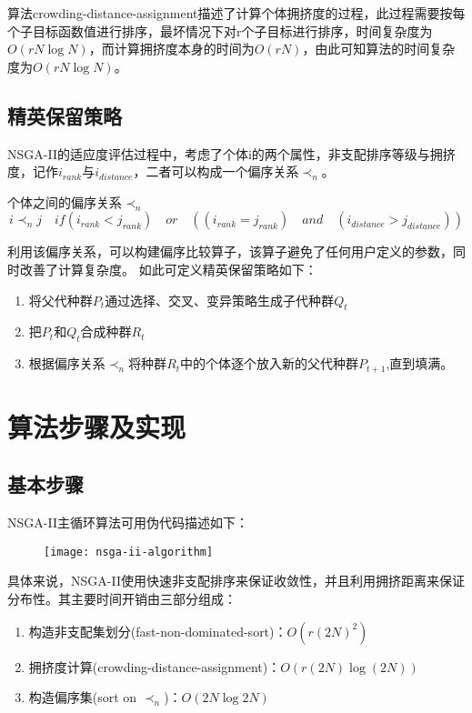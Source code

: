 \documentclass[lang=cn,a4paper,citestyle=gb7714-2015, bibstyle=gb7714-2015]{elegantpaper}
\begin{document}
    算法crowding-distance-assignment描述了计算个体拥挤度的过程，此过程需要按每个子目标函数值进行排序，最坏情况下对r个子目标进行排序，时间复杂度为$O(rN\log N)$，而计算拥挤度本身的时间为$O(rN)$，由此可知算法的时间复杂度为$O(rN\log N)$。

    \subsection{精英保留策略}
    NSGA-II的适应度评估过程中，考虑了个体i的两个属性，非支配排序等级与拥挤度，记作$i_{rank}$与$i_{distance}$，二者可以构成一个偏序关系$\prec_n$。

    \begin{definition}
        个体之间的偏序关系$\prec_n$
        $$i\prec_nj\quad if(i_{rank}<j_{rank})\quad or\quad ((i_{rank}=j_{rank})\quad and\quad  (i_{distance} > j_{distance}))$$
    \end{definition}
    利用该偏序关系，可以构建偏序比较算子，该算子避免了任何用户定义的参数，同时改善了计算复杂度。
    如此可定义精英保留策略如下：
    \begin{enumerate}
        \item 将父代种群$P_t$通过选择、交叉、变异策略生成子代种群$Q_t$
        \item 把$P_t$和$Q_t$合成种群$R_t$
        \item 根据偏序关系$\prec_n$将种群$R_t$中的个体逐个放入新的父代种群$P_{t+1}$,直到填满。
    \end{enumerate}

    \section{算法步骤及实现}

    \subsection{基本步骤}
    NSGA-II主循环算法可用伪代码描述如下：

    \begin{figure}[!h]
        \centering
        \texttt{[image: nsga-ii-algorithm]}
    \end{figure}

    具体来说，NSGA-II使用快速非支配排序来保证收敛性，并且利用拥挤距离来保证分布性。其主要时间开销由三部分组成：
    \begin{enumerate}
        \item 构造非支配集划分(fast-non-dominated-sort)：$O(r(2N)^2)$
        \item 拥挤度计算(crowding-distance-assignment)：$O(r(2N)\log (2N))$
        \item 构造偏序集(sort on $\prec_n$)：$O(2N\log2N)$
    \end{enumerate}
\end{document}
